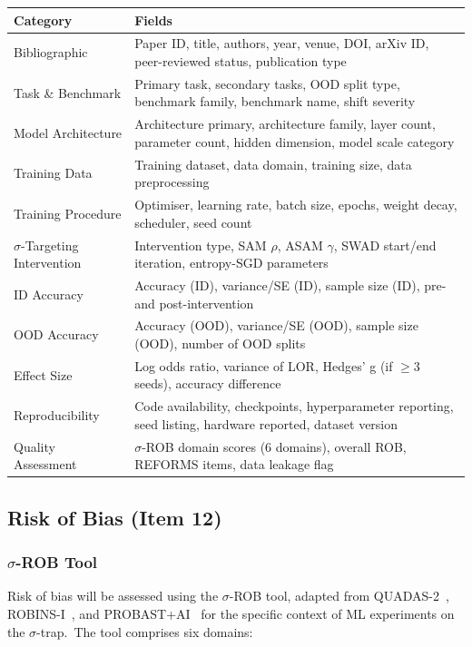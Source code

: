 \medskip
\begin{longtable}{p{3cm} p{9cm}}
\toprule
\textbf{Category} & \textbf{Fields} \\
\midrule
\endhead
\bottomrule
\endfoot
Bibliographic & Paper ID, title, authors, year, venue, DOI, arXiv ID, peer-reviewed status, publication type \\
Task \& Benchmark & Primary task, secondary tasks, OOD split type, benchmark family, benchmark name, shift severity \\
Model Architecture & Architecture primary, architecture family, layer count, parameter count, hidden dimension, model scale category \\
Training Data & Training dataset, data domain, training size, data preprocessing \\
Training Procedure & Optimiser, learning rate, batch size, epochs, weight decay, scheduler, seed count \\
$\sigma$-Targeting Intervention & Intervention type, SAM $\rho$, ASAM $\gamma$, SWAD start/end iteration, entropy-SGD parameters \\
ID Accuracy & Accuracy (ID), variance/SE (ID), sample size (ID), pre- and post-intervention \\
OOD Accuracy & Accuracy (OOD), variance/SE (OOD), sample size (OOD), number of OOD splits \\
Effect Size & Log odds ratio, variance of LOR, Hedges' g (if $\geq3$ seeds), accuracy difference \\
Reproducibility & Code availability, checkpoints, hyperparameter reporting, seed listing, hardware reported, dataset version \\
Quality Assessment & $\sigma$-ROB domain scores (6 domains), overall ROB, REFORMS items, data leakage flag \\
\bottomrule
\end{longtable}

\subsection{Risk of Bias (Item 12)}

\subsubsection{$\sigma$-ROB Tool}

Risk of bias will be assessed using the $\sigma$-ROB tool, adapted from QUADAS-2~\cite{whiting2011quadas2}, ROBINS-I~\cite{sterne2016robinsi}, and PROBAST+AI~\cite{moons2025probastaialpha} for the specific context of ML experiments on the $\sigma$-trap.\ The tool comprises six domains:


